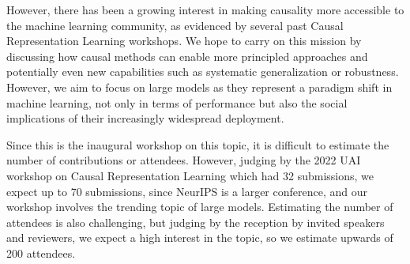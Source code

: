 \documentclass{article}
\begin{document}
However, there has been a growing interest in making causality more accessible to the machine learning community, as evidenced by several past Causal Representation Learning workshops. We hope to carry on this mission by discussing how causal methods can enable more principled approaches and potentially even new capabilities such as systematic generalization or robustness. However, we aim to focus on large models as they represent a paradigm shift in machine learning, not only in terms of performance but also the social implications of their increasingly widespread deployment.

Since this is the inaugural workshop on this topic, it is difficult to estimate the number of contributions or attendees. However, judging by the 2022 UAI workshop on Causal Representation Learning which had 32 submissions, we expect up to 70 submissions, since NeurIPS is a larger conference, and our workshop involves the trending topic of large models. Estimating the number of attendees is also challenging, but judging by the reception by invited speakers and reviewers, we expect a high interest in the topic, so we estimate upwards of 200 attendees.








% 

\end{document}
